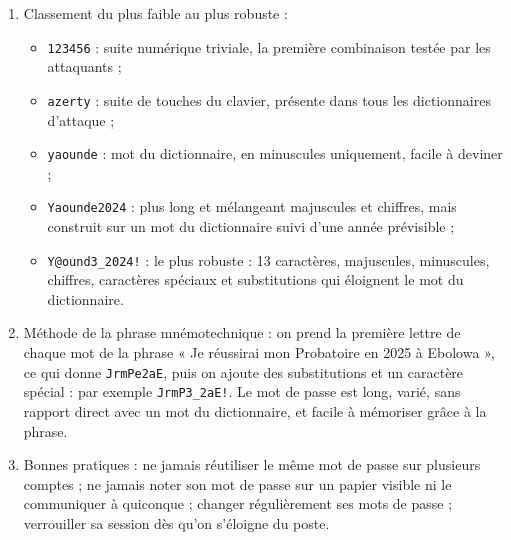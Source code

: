 \documentclass[11pt]{article}
\begin{document}
\begin{corrige}
\begin{enumerate}
\item Classement du plus faible au plus robuste :
\begin{itemize}
\item \texttt{123456} : suite numérique triviale, la première combinaison testée par les attaquants ;
\item \texttt{azerty} : suite de touches du clavier, présente dans tous les dictionnaires d'attaque ;
\item \texttt{yaounde} : mot du dictionnaire, en minuscules uniquement, facile à deviner ;
\item \texttt{Yaounde2024} : plus long et mélangeant majuscules et chiffres, mais construit sur un mot du dictionnaire suivi d'une année prévisible ;
\item \texttt{Y@ound3\_2024!} : le plus robuste : 13 caractères, majuscules, minuscules, chiffres, caractères spéciaux et substitutions qui éloignent le mot du dictionnaire.
\end{itemize}
\item Méthode de la phrase mnémotechnique : on prend la première lettre de chaque mot de la phrase « Je réussirai mon Probatoire en 2025 à Ebolowa », ce qui donne \texttt{JrmPe2aE}, puis on ajoute des substitutions et un caractère spécial : par exemple \texttt{JrmP3\_2aE!}. Le mot de passe est long, varié, sans rapport direct avec un mot du dictionnaire, et facile à mémoriser grâce à la phrase.
\item Bonnes pratiques : ne jamais réutiliser le même mot de passe sur plusieurs comptes ; ne jamais noter son mot de passe sur un papier visible ni le communiquer à quiconque ; changer régulièrement ses mots de passe ; verrouiller sa session dès qu'on s'éloigne du poste.
\end{enumerate}
\end{corrige}
\end{document}
